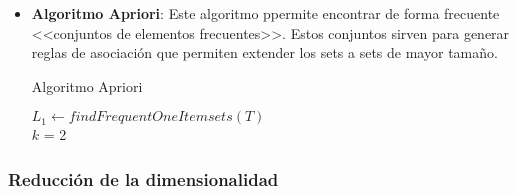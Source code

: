 \begin{itemize}
  \item \textbf{Algoritmo Apriori}: Este algoritmo ppermite encontrar de forma frecuente <<conjuntos de elementos frecuentes>>. Estos conjuntos sirven para generar reglas de asociación que permiten extender los sets a sets de mayor tamaño.

        \begin{algorithm}[H]
          \caption{Algoritmo Apriori}

          \BlankLine
          \BlankLine

          $L_1 \leftarrow findFrequentOneItemsets(T)$\\
          $k$  = 2\\

          \BlankLine

          \BlankLine

        \end{algorithm}

\end{itemize}

\subsubsection{Reducción de la dimensionalidad}

